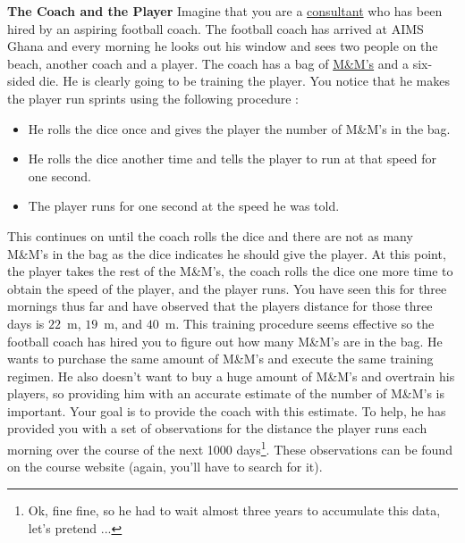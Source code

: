\documentclass[12pt]{article}
\begin{document}
\newpage

\textbf{The Coach and the Player}
\newline
Imagine that you are a \href{https://en.wikipedia.org/wiki/Consultant}{consultant} who has been hired by an aspiring football coach.  The football coach has arrived at AIMS Ghana and every morning he looks out his window and sees two people on the beach, another coach and a player.  The coach has a bag of \href{http://www.mms.com/}{M\&M's} and a six-sided die.  He is clearly going to be training the player.  You notice that he makes the player run sprints using the following procedure :
\begin{itemize}[noitemsep]
\item He rolls the dice once and gives the player the number of M\&M's in the bag.  
\item He rolls the dice another time and tells the player to run at that speed for one second.
\item The player runs for one second at the speed he was told.
\end{itemize}
This continues on until the coach rolls the dice and there are not as many M\&M's in the bag as the dice indicates he should give the player.  At this point, the player takes the rest of the M\&M's, the coach rolls the dice one more time to obtain the speed of the player, and the player runs.  You have seen this for three mornings thus far and have observed that the players distance for those three days is $22$~m, $19$~m, and $40$~m.  
\newline
\newline
This training procedure seems effective so the football coach has hired you to figure out how many M\&M's are in the bag.  He wants to purchase the same amount of M\&M's and execute the same training regimen.  He also doesn't want to buy a huge amount of M\&M's and overtrain his players, so providing him with an accurate estimate of the number of M\&M's is important.
\newline
\newline
Your goal is to provide the coach with this estimate.
\newline
\newline
To help, he has provided you with a set of observations for the distance the player runs each morning over the course of the next 1000 days\footnote{Ok, fine fine, so he had to wait almost three years to accumulate this data, let's pretend ...}.  These observations can be found on the course website (again, you'll have to search for it).
\end{document}

